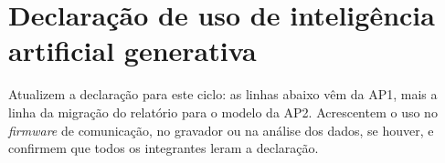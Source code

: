 \chapter{Declaração de uso de inteligência artificial generativa}
\label{ap:ia}

\begin{orientacao}
Atualizem a declaração para este ciclo: as linhas abaixo vêm da AP1,
mais a linha da migração do relatório para o modelo da AP2. Acrescentem
o uso no \emph{firmware} de comunicação, no gravador ou na análise dos
dados, se houver, e confirmem que todos os integrantes leram a
declaração.
\end{orientacao}

